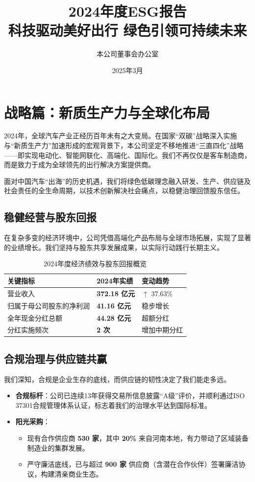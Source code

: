 \documentclass[a4paper,12pt]{article}
\title{\textbf{\huge 2024年度ESG报告}\\ \vspace{0.5em} \large 科技驱动美好出行 \quad 绿色引领可持续未来}
\author{本公司董事会办公室}
\date{2025年3月}
\begin{document}
\maketitle

\section{战略篇：新质生产力与全球化布局}

2024年，全球汽车产业正经历百年未有之大变局。在国家“双碳”战略深入实施与“新质生产力”加速形成的宏观背景下，本公司坚定不移地推进“三直四化”战略——即实现电动化、智能网联化、高端化、国际化。我们不再仅仅是客车制造商，而是致力于成为全球领先的出行解决方案提供商。

面对中国汽车“出海”的历史机遇，我们将绿色低碳理念融入研发、生产、供应链及社会责任的全生命周期，以技术创新解决社会痛点，以稳健治理回馈股东信任。

\subsection{稳健经营与股东回报}
在复杂多变的经济环境中，公司凭借高端化产品布局与全球市场拓展，实现了显著的业绩增长。我们坚持与股东共享发展成果，以实际行动践行长期主义。

\begin{table}[h]
\centering
\caption{2024年度经济绩效与股东回报概览}
\renewcommand{\arraystretch}{1.3}
\begin{tabular}{p{} p{} p{}}
\toprule
\textbf{关键指标} & \textbf{2024年实绩} & \textbf{变动趋势} \\
\midrule
营业收入 & \textbf{372.18 亿元} & $\uparrow$ 37.63\% \\
归属于母公司股东的净利润 & \textbf{41.16 亿元} & 稳步增长 \\
全年现金分红总额 & \textbf{44.28 亿元} & 超额分红 \\
分红实施频次 & \textbf{2 次} & 增加中期分红 \\
\bottomrule
\end{tabular}
\end{table}

\subsection{合规治理与供应链共赢}
我们深知，合规是企业生存的底线，而供应链的韧性决定了我们能走多远。
\begin{itemize}
    \item \textbf{合规标杆}：公司已连续13年获得交易所信息披露“A级”评价，并顺利通过ISO 37301合规管理体系认证，标志着我们的治理水平达到国际标准。
    \item \textbf{阳光采购}：
    \begin{itemize}
        \item 现有合作供应商 \textbf{530 家}，其中 \textbf{20\%} 来自河南本地，有力带动了区域装备制造业的集群发展。
        \item 严守廉洁底线，已与超过 \textbf{900 家} 供应商（含潜在合作伙伴）签署廉洁协议，构建清亲商业生态。
    \end{itemize}
\end{itemize}
\end{document}
